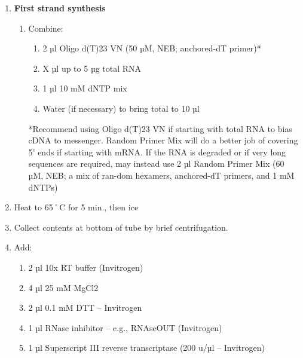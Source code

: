 \documentclass[
  letterpaper,
  DIV=11,
  numbers=noendperiod]{scrreprt}
\providecommand{\tightlist}{%
  \setlength{\itemsep}{0pt}\setlength{\parskip}{0pt}}\usepackage{longtable,booktabs,array}
\begin{document}
\begin{enumerate}
\def\labelenumi{\arabic{enumi}.}
\item
  \textbf{First strand synthesis}

  \begin{enumerate}
  \def\labelenumii{\arabic{enumii}.}
  \item
    Combine:

    \begin{enumerate}
    \def\labelenumiii{\arabic{enumiii}.}
    \tightlist
    \item
      2 µl Oligo d(T)23 VN (50 µM, NEB; anchored-dT primer)*
    \item
      X µl up to 5 µg total RNA
    \item
      1 µl 10 mM dNTP mix
    \item
      Water (if necessary) to bring total to 10 µl
    \end{enumerate}

    \begin{tcolorbox}[enhanced jigsaw, rightrule=.15mm, title=\textcolor{quarto-callout-important-color}{\faExclamation}\hspace{0.5em}{NOTE}, titlerule=0mm, opacitybacktitle=0.6, toprule=.15mm, bottomrule=.15mm, opacityback=0, left=2mm, colframe=quarto-callout-important-color-frame, breakable, coltitle=black, colback=white, colbacktitle=quarto-callout-important-color!10!white, bottomtitle=1mm, leftrule=.75mm, toptitle=1mm, arc=.35mm]

    *Recommend using Oligo d(T)23 VN if starting with total RNA to bias
    cDNA to messenger. Random Primer Mix will do a better job of
    covering 5' ends if starting with mRNA. If the RNA is degraded or if
    very long sequences are required, may instead use 2 µl Random Primer
    Mix (60 µM, NEB; a mix of ran-dom hexamers, anchored-dT primers, and
    1 mM dNTPs)

    \end{tcolorbox}
  \end{enumerate}
\item
  Heat to 65˚C for 5 min., then ice
\item
  Collect contents at bottom of tube by brief centrifugation.
\item
  Add:

  \begin{enumerate}
  \def\labelenumii{\arabic{enumii}.}
  \tightlist
  \item
    2 µl 10x RT buffer (Invitrogen)
  \item
    4 µl 25 mM MgCl2
  \item
    2 µl 0.1 mM DTT -- Invitrogen
  \item
    1 µl RNase inhibitor -- e.g., RNAseOUT (Invitrogen)
  \item
    1 µl Superscript III reverse transcriptase (200 u/µl -- Invitrogen)
  \end{enumerate}


\end{enumerate}
\end{document}
